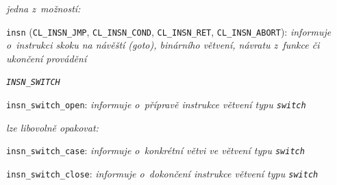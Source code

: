 \smallskip
\begin{myitemize}[itemsep=0pt,partopsep=0pt,parsep=0pt,topsep=0pt,label=\textbullet]
  \item[\ndash] \textsl{jedna z~možností:}
    \begin{myitemize}[itemsep=0pt,partopsep=0pt,parsep=0pt,topsep=0pt,label=\textbullet]
      \item \texttt{insn} (\texttt{CL\_INSN\_JMP},
                           \texttt{CL\_INSN\_COND}, 
                           \texttt{CL\_INSN\_RET}, 
                           \texttt{CL\_INSN\_ABORT}): \textit{informuje o~instrukci
                                                              skoku na návěští (goto),
                                                              binárního větvení,
                                                              návratu z~funkce
                                                              či ukončení provádění}
      \item[\whitebullet] \texttt{\textit{INSN\_SWITCH}}
        \begin{myitemize}[itemsep=0pt,partopsep=0pt,parsep=0pt,topsep=0pt,label=\textbullet]
          \item \texttt{insn\_switch\_open}: \textit{informuje o~přípravě instrukce větvení typu \texttt{switch}}
          \item[\ndash] \textsl{lze libovolně opakovat:}
            \begin{myitemize}[itemsep=0pt,partopsep=0pt,parsep=0pt,topsep=0pt,label=\textbullet]
              \item \texttt{insn\_switch\_case}: \textit{informuje o~konkrétní větvi ve větvení typu \texttt{switch}}
            \end{myitemize}
          \item \texttt{insn\_switch\_close}: \textit{informuje o~dokončení instrukce větvení typu \texttt{switch}}
        \end{myitemize}
    \end{myitemize}
\end{myitemize}
